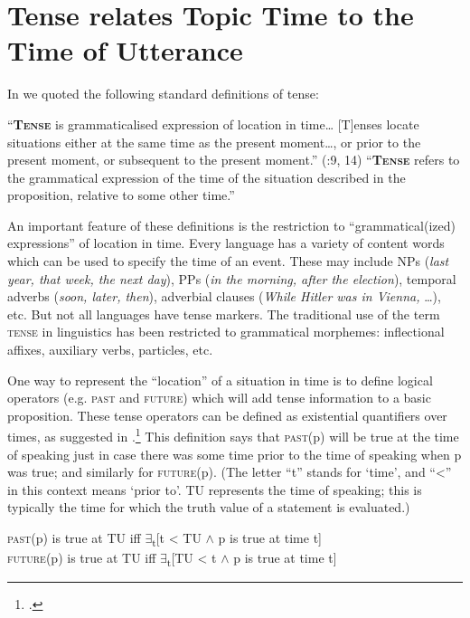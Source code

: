\section{Tense relates Topic Time to the Time of Utterance}\label{sec:21.2}

In  we quoted the following standard definitions of tense:


\ea \label{ex:21.2}
\ea   “\textbf{\textsc{Tense}} is grammaticalised expression of location in time… [T]enses locate situations either at the same time as the present moment…, or prior to the present moment, or subsequent to the present moment.” (\citealt{Comrie1985}:9, 14)
\ex   “\textbf{\textsc{Tense}} refers to the grammatical expression of the time of the situation described in the proposition, relative to some other time.” \citep{Bybee1985}
\z \z


An important feature of these definitions is the restriction to “grammatical(ized) expressions” of location in time. Every language has a variety of content words which can be used to specify the time of an event. These may include NPs (\textit{last year, that week, the next day}), PPs (\textit{in the morning, after the election}), temporal adverbs (\textit{soon, later, then}), adverbial clauses (\textit{While Hitler was in Vienna,} …), etc. But not all languages have tense markers. The traditional use of the term \textsc{tense} in linguistics has been restricted to grammatical morphemes: inflectional affixes, auxiliary verbs, particles, etc.



One way to represent the “location” of a situation in time is to define logical operators (e.g. \textsc{past} and \textsc{future}) which will add tense information to a basic proposition. These tense operators can be defined as existential quantifiers over times, as suggested in .\footnote{\citet{Prior1957,Prior1967}.} This definition says that \textsc{past}(p) will be true at the time of speaking just in case there was some time prior to the time of speaking when p was true; and similarly for \textsc{future}(p). (The letter “t” stands for ‘time’, and “<” in this context means ‘prior to’. TU represents the time of speaking; this is typically the time for which the truth value of a statement is evaluated.)


\ea \label{ex:21.3}
\textsc{past}(p) is true at TU  iff  ${\exists}$\textsubscript{t}[t < TU $\wedge$ p is true at time t]\\
\textsc{future}(p) is true at TU  iff  ${\exists}$\textsubscript{t}[TU < t $\wedge$ p is true at time t]
\z


